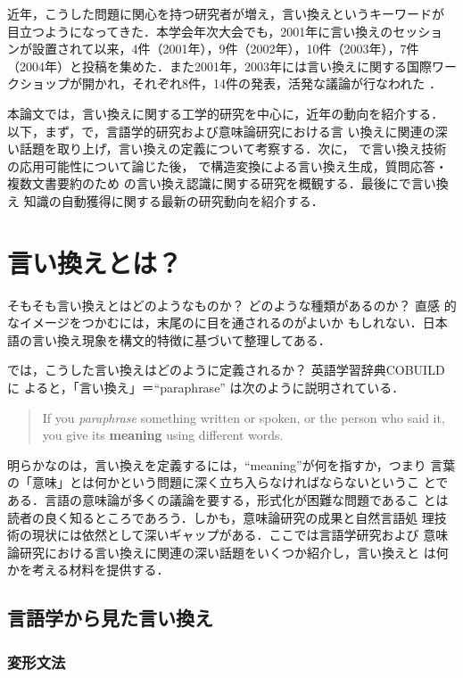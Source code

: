 近年，こうした問題に関心を持つ研究者が増え，言い換えというキーワードが
目立つようになってきた．本学会年次大会でも，2001年に言い換えのセッショ
ンが設置されて以来，4件（2001年），9件（2002年），10件（2003年），7件
（2004年）と投稿を集めた．また2001年，2003年には言い換えに関する国際ワー
クショップが開かれ，それぞれ8件，14件の発表，活発な議論が行なわれた
\cite{NLPRSWS:01,IWP:03}．

本論文では，言い換えに関する工学的研究を中心に，近年の動向を紹介する．
以下，まず，で，言語学的研究および意味論研究における言
い換えに関連の深い話題を取り上げ，言い換えの定義について考察する．次に，
で言い換え技術の応用可能性について論じた後，
で構造変換による言い換え生成，質問応答・複数文書要約のため
の言い換え認識に関する研究を概観する．最後にで言い換え
知識の自動獲得に関する最新の研究動向を紹介する．

\section{言い換えとは？}
\label{sec:definition}

そもそも言い換えとはどのようなものか？ どのような種類があるのか？ 直感
的なイメージをつかむには，末尾のに目を通されるのがよいか
もしれない．日本語の言い換え現象を構文的特徴に基づいて整理してある．

では，こうした言い換えはどのように定義されるか？ 英語学習辞典COBUILDに
よると，「言い換え」＝``paraphrase'' は次のように説明されている．
\begin{quote}
If you \emph{paraphrase} something written or spoken, or the person
who said it, you give its \textbf{meaning} using different words.
\end{quote}
明らかなのは，言い換えを定義するには，``meaning''が何を指すか，つまり
言葉の「意味」とは何かという問題に深く立ち入らなければならないというこ
とである．言語の意味論が多くの議論を要する，形式化が困難な問題であるこ
とは読者の良く知るところであろう．しかも，意味論研究の成果と自然言語処
理技術の現状には依然として深いギャップがある．ここでは言語学研究および
意味論研究における言い換えに関連の深い話題をいくつか紹介し，言い換えと
は何かを考える材料を提供する．

\subsection{言語学から見た言い換え}
\label{ssec:ling_pov}

\subsubsection{変形文法}
\label{sssec:trans}


